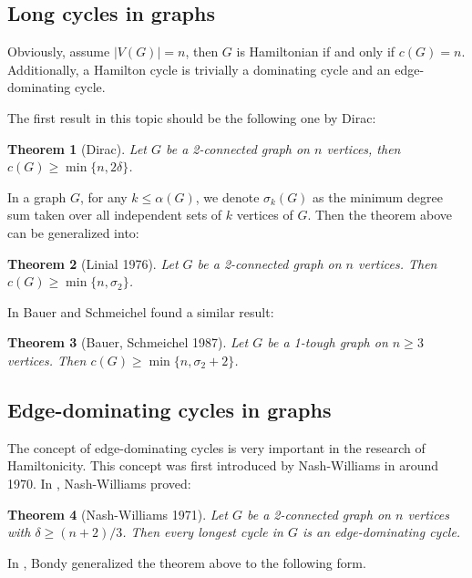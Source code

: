 \documentclass[12pt]{report}
\newtheorem{theorem}{Theorem}
\begin{document}
\subsection{Long cycles in graphs}

Obviously, assume $|V(G)|=n$, then $G$ is Hamiltonian if and only if $c(G)=n$. Additionally, a Hamilton cycle is trivially a dominating cycle and an edge-dominating cycle.

The first result in this topic should be the following one by Dirac:



\begin{theorem}[Dirac]
Let $G$ be a 2-connected graph on $n$ vertices, then $c(G)\ge\min\{n,2\delta\}$.
\end{theorem}

In a graph $G$, for any $k\le\alpha(G)$, we denote $\sigma_k(G)$ as the minimum degree sum taken over all independent sets of $k$ vertices of $G$.
Then the theorem above can be generalized \cite{linial1976lower} into:
\begin{theorem}[Linial 1976]
Let $G$ be a 2-connected graph on $n$ vertices. Then $c(G)\ge\min\{n,\sigma_2\}$.
\end{theorem}


In \cite{bauer1987long} Bauer and Schmeichel found a similar result:
\begin{theorem}[Bauer, Schmeichel 1987]\label{bauschd2}
Let $G$ be a 1-tough graph on $n\ge3$ vertices. Then $c(G)\ge \min\{n,\sigma_2+2\}$.
\end{theorem}








\subsection{Edge-dominating cycles in graphs}

The concept of edge-dominating cycles is very important in the research of Hamiltonicity. This concept was first introduced by Nash-Williams in around 1970. In \cite{nash1971edge}, Nash-Williams proved:
\begin{theorem}[Nash-Williams 1971]\label{nashd}
Let $G$ be a 2-connected graph on $n$ vertices with $\delta\ge(n+2)/3$. Then every longest cycle in $G$ is an edge-dominating cycle.
\end{theorem}


In \cite{bondy1980longest}, Bondy generalized the theorem above to the following form.
\end{document}
